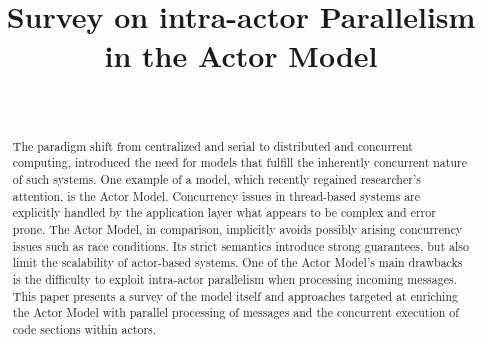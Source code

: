 \documentclass[11pt, journal]{IEEEtran}
\newcommand{\Title}{Survey on intra-actor Parallelism in the Actor Model}
\newcommand{\Authors}{Michael R\"ufenacht}
\begin{document}

\title{\Title}
\thispagestyle{empty}
\author{
	\IEEEauthorblockN{\Authors}\\				
}
		
\maketitle



\begin{abstract}
The paradigm shift from centralized and serial to distributed and concurrent computing, introduced the need for models that fulfill the inherently concurrent nature of such systems. One example of a model, which recently regained researcher's attention, is the Actor Model. Concurrency issues in thread-based systems are explicitly handled by the application layer what appears to be complex and error prone. The Actor Model, in comparison, implicitly avoids possibly arising concurrency issues such as race conditions. Its strict semantics introduce strong guarantees, but also limit the scalability of actor-based systems. One of the Actor Model's main drawbacks is the difficulty to exploit intra-actor parallelism when processing incoming messages. This paper presents a survey of the model itself and approaches targeted at enriching the Actor Model with parallel processing of messages and the concurrent execution of code sections within actors.
\end{abstract}

\end{document}
